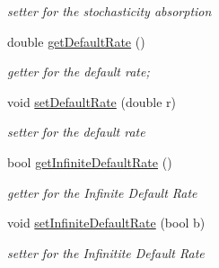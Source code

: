 \begin{DoxyCompactItemize}
\begin{DoxyCompactList}\small\item\em setter for the stochasticity absorption \end{DoxyCompactList}\item 
\hypertarget{class_p_h_aa64e3d43f773122df2329491f6abdf6c}{double \hyperlink{class_p_h_aa64e3d43f773122df2329491f6abdf6c}{get\-Default\-Rate} ()}\label{class_p_h_aa64e3d43f773122df2329491f6abdf6c}

\begin{DoxyCompactList}\small\item\em getter for the default rate; \end{DoxyCompactList}\item 
\hypertarget{class_p_h_ae49be2823d5a2a7c6517b6783cf9fdfa}{void \hyperlink{class_p_h_ae49be2823d5a2a7c6517b6783cf9fdfa}{set\-Default\-Rate} (double r)}\label{class_p_h_ae49be2823d5a2a7c6517b6783cf9fdfa}

\begin{DoxyCompactList}\small\item\em setter for the default rate \end{DoxyCompactList}\item 
\hypertarget{class_p_h_a7ede855d04ee8e3a20beb159c5520003}{bool \hyperlink{class_p_h_a7ede855d04ee8e3a20beb159c5520003}{get\-Infinite\-Default\-Rate} ()}\label{class_p_h_a7ede855d04ee8e3a20beb159c5520003}

\begin{DoxyCompactList}\small\item\em getter for the \-Infinite \-Default \-Rate \end{DoxyCompactList}\item 
\hypertarget{class_p_h_acc38a15dc0e29ddfd2c8ae7d3371f7ab}{void \hyperlink{class_p_h_acc38a15dc0e29ddfd2c8ae7d3371f7ab}{set\-Infinite\-Default\-Rate} (bool b)}\label{class_p_h_acc38a15dc0e29ddfd2c8ae7d3371f7ab}

\begin{DoxyCompactList}\small\item\em setter for the \-Infinitite \-Default \-Rate \end{DoxyCompactList}\end{DoxyCompactItemize}
